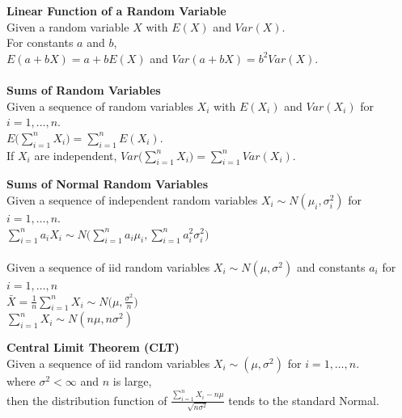 \documentclass[bigtut]{tutorial}\usepackage[]{graphicx}\usepackage[]{color}
\begin{document}

\begin{tutorial}

\begin{displaybox}
{\bf Linear Function of a Random Variable}  \\ 
Given a random variable $X$ with $E(X)$ and $Var(X)$. \\
For constants $a$ and $b$,  \\
 $E(a+bX) = a + bE(X)$ and $Var(a+bX) = b^2 Var(X)$. \\ \\

{\bf Sums of Random Variables}  \\ 
Given a sequence of random variables $X_i$ with $E(X_i)$ and $Var(X_i)$ for $i=1,\ldots,n$. \\
$E \Big( \sum_{i=1}^{n} X_i  \Big)    = \sum_{i=1}^{n} E(X_i)$.  \\
If  $X_i$ are independent,  $Var \Big( \sum_{i=1}^{n} X_i \Big) = \sum_{i=1}^{n} Var(X_i)$. 
\end{displaybox}

\begin{displaybox}
{\bf Sums of Normal Random Variables}  \\ 
Given a sequence of independent random variables $X_i \sim N(\mu_i, \sigma_i^2)$ for $i=1,\ldots,n$. \\
$ \sum_{i=1}^{n} a_i X_i     \sim N \Big(  \sum_{i=1}^{n} a_i \mu_i, \sum_{i=1}^{n} a_i^2 \sigma_i^2 \Big)$ \\ \\

Given a sequence of iid random variables $X_i \sim N(\mu, \sigma^2)$ and constants $a_{i}$ for $i=1,\ldots,n$  \\
$ \bar{X} = \frac{1}{n} \sum_{i=1}^{n} X_i     \sim N \Big(  \mu, \frac{\sigma^2}{n} \Big) $ \\
$ \sum_{i=1}^{n} X_i     \sim N(  n \mu, n \sigma^2)$ \\ 
\end{displaybox}

\begin{displaybox}
{\bf Central Limit Theorem (CLT)} \\

Given a sequence of iid random variables $X_i \sim ( \mu, \sigma^2) $  for $i=1,\ldots,n$. \\
where $\sigma^2 < \infty$ and $n$ is large, \\
then the distribution function of  $ \frac{ \sum_{i=1}^{n} X_i  - n \mu } { \sqrt{n \sigma^2} }$ tends  to the standard Normal. \\ 


\end{displaybox}
\end{tutorial}
\end{document}
